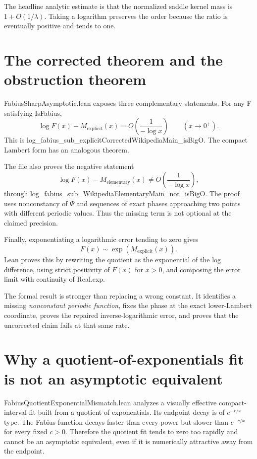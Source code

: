 \documentclass[11pt,a4paper,openany]{book}
\def\module#1{#1.lean}
\def\decl#1{#1}
\def\code#1{#1}
\newcommand{\module}[1]{\nolinkurl{#1.lean}}
\newcommand{\decl}[1]{\texttt{\detokenize{#1}}}
\newcommand{\code}[1]{\texttt{\detokenize{#1}}}
\begin{document}
The headline analytic estimate is that the normalized saddle kernel mass is
$1+O(1/\lambda)$.  Taking a logarithm preserves the order because the ratio is
eventually positive and tends to one.

\section{The corrected theorem and the obstruction theorem}
\module{FabiusSharpAsymptotic} exposes three complementary statements.  For
any \code{F} satisfying \decl{IsFabius},
\[
 \log F(x)-M_{\mathrm{explicit}}(x)
   =O\!\left(\frac1{-\log x}\right)
 \qquad(x\to0^+).
\]
This is
\decl{log_fabius_sub_explicitCorrectedWikipediaMain_isBigO}.  The compact
Lambert form has an analogous theorem.

The file also proves the negative statement
\[
 \log F(x)-M_{\mathrm{elementary}}(x)
 \ne O\!\left(\frac1{-\log x}\right),
\]
through \decl{log_fabius_sub_WikipediaElementaryMain_not_isBigO}.  The proof
uses nonconstancy of $\Psi$ and sequences of exact phases approaching two
points with different periodic values.  Thus the missing term is not optional
at the claimed precision.

Finally, exponentiating a logarithmic error tending to zero gives
\[
 F(x)\sim \exp(M_{\mathrm{explicit}}(x)).
\]
Lean proves this by rewriting the quotient as the exponential of the log
difference, using strict positivity of $F(x)$ for $x>0$, and composing the
error limit with continuity of \code{Real.exp}.

\begin{correction}
The formal result is stronger than replacing a wrong constant.  It identifies
a missing \emph{nonconstant periodic function}, fixes the phase at the exact
lower-Lambert coordinate, proves the repaired inverse-logarithmic error, and
proves that the uncorrected claim fails at that same rate.
\end{correction}

\section{Why a quotient-of-exponentials fit is not an asymptotic equivalent}
\module{FabiusQuotientExponentialMismatch} analyzes a visually effective
compact-interval fit built from a quotient of exponentials.  Its endpoint decay
is of $e^{-c/x}$ type.  The Fabius function decays faster than every power but
slower than $e^{-c/x}$ for every fixed $c>0$.  Therefore the quotient fit tends
to zero too rapidly and cannot be an asymptotic equivalent, even if it is
numerically attractive away from the endpoint.
\end{document}
